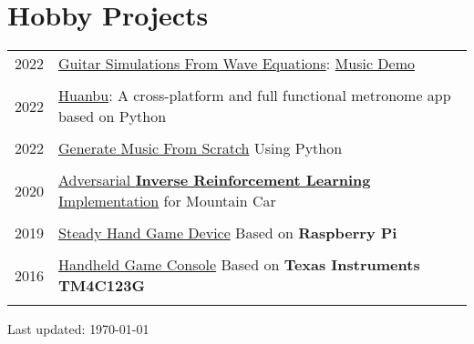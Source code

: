 \documentclass[a4paper,10pt]{article} %
\begin{document}
\section{Hobby Projects}
\begin{tabular}{r|l}	
	2022 &
\href{https://github.com/HuangJiaLian/Guitar_Simulations}{Guitar Simulations From Wave Equations}: \href{https://nbviewer.org/github/HuangJiaLian/DataBase0/blob/master/uPic/2022_10_02_14_7_11_Happy_Birthday_To_Ya.mp3}{Music Demo}\\
\multicolumn{2}{c}{} \\	%

	2022 &
\href{https://github.com/HuangJiaLian/HuanBu_Metronome}{Huanbu}: A cross-platform and full functional metronome app based on Python\\
\multicolumn{2}{c}{} \\	%
	
	2022 &
	\href{https://medium.com/@jackhuang.wz/generate-music-from-scratch-using-python-53c0fedd0031}{Generate Music From Scratch}  Using Python\\
    \multicolumn{2}{c}{} \\	%
    
	2020						&
	\href{https://github.com/HuangJiaLian/AIRL_MountainCar}{Adversarial \textbf{Inverse Reinforcement Learning} Implementation} for Mountain Car \\
	\multicolumn{2}{c}{} \\	%
	
	2019						&
	\href{https://cdn.jsdelivr.net/gh/HuangJiaLian/DataBase0@master/uPic/2021_12_16_21_SteadyHand.jpeg}{Steady Hand Game Device} Based on \textbf{Raspberry Pi}\\	
	\multicolumn{2}{c}{} \\	%
	
	2016                        & \href{https://nbviewer.org/github/HuangJiaLian/DataBase0/blob/e193f936c297a5e97dfd8eae7b8c86288c721623/uPic/2021_12_16_21_Game_Boy.pdf}{Handheld Game Console} Based on \textbf{Texas Instruments TM4C123G}\\
	\multicolumn{2}{c}{} \\	%
\end{tabular}
\begin{flushright} 
Last updated: {\today}
\end{flushright}
\end{document}
